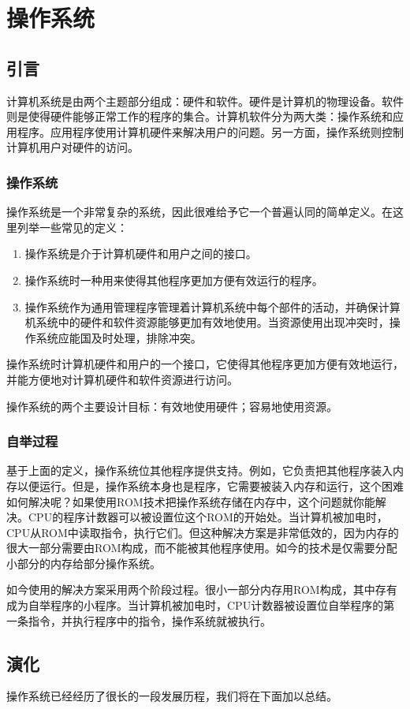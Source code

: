 \chapter{操作系统}
\section{引言}
计算机系统是由两个主题部分组成：硬件和软件。硬件是计算机的物理设备。软件则是使得硬件能够正常工作的程序的集合。计算机软件分为两大类：操作系统和应用程序。应用程序使用计算机硬件来解决用户的问题。另一方面，操作系统则控制计算机用户对硬件的访问。
\subsection{操作系统}
操作系统是一个非常复杂的系统，因此很难给予它一个普遍认同的简单定义。在这里列举一些常见的定义：
\begin{enumerate}
	\item 操作系统是介于计算机硬件和用户之间的接口。
	\item 操作系统时一种用来使得其他程序更加方便有效运行的程序。
	\item 操作系统作为通用管理程序管理着计算机系统中每个部件的活动，并确保计算机系统中的硬件和软件资源能够更加有效地使用。当资源使用出现冲突时，操作系统应能国及时处理，排除冲突。
\end{enumerate}
操作系统时计算机硬件和用户的一个接口，它使得其他程序更加方便有效地运行，并能方便地对计算机硬件和软件资源进行访问。

操作系统的两个主要设计目标：有效地使用硬件；容易地使用资源。
\subsection{自举过程}
基于上面的定义，操作系统位其他程序提供支持。例如，它负责把其他程序装入内存以便运行。但是，操作系统本身也是程序，它需要被装入内存和运行，这个困难如何解决呢？如果使用ROM技术把操作系统存储在内存中，这个问题就你能解决。CPU的程序计数器可以被设置位这个ROM的开始处。当计算机被加电时，CPU从ROM中读取指令，执行它们。但这种解决方案是非常低效的，因为内存的很大一部分需要由ROM构成，而不能被其他程序使用。如今的技术是仅需要分配小部分的内存给部分操作系统。

如今使用的解决方案采用两个阶段过程。很小一部分内存用ROM构成，其中存有成为自举程序的小程序。当计算机被加电时，CPU计数器被设置位自举程序的第一条指令，并执行程序中的指令，操作系统就被执行。
\section{演化}
操作系统已经经历了很长的一段发展历程，我们将在下面加以总结。
